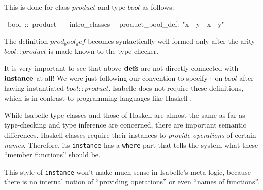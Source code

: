 \begin{isabelle}
\begin{isamarkuptext}
 This is done for class $product$ and type $bool$ as follows.%
\end{isamarkuptext}%
~bool~::~product\isanewline
~~~intro\_classes\isanewline
{}\isanewline
~~product\_bool\_def:~{"}x~{\isasymOtimes}~y~{\isasymequiv}~x~{\isasymand}~y{"}%
\begin{isamarkuptext}%
The definition $prod_bool_def$ becomes syntactically well-formed only
 after the arity $bool :: product$ is made known to the type checker.

 \medskip It is very important to see that above ${\mathord{\mathbf{defs}}}$ are not
 directly connected with ${\mathord{\mathbf{instance}}}$ at all!  We were
 just following our convention to specify $\cdot$ on $bool$ after
 having instantiated $bool :: product$.  Isabelle does not require
 these definitions, which is in contrast to programming languages like
 Haskell \cite{haskell-report}.

 \medskip While Isabelle type classes and those of Haskell are almost
 the same as far as type-checking and type inference are concerned,
 there are important semantic differences.  Haskell classes require
 their instances to \emph{provide operations} of certain \emph{names}.
 Therefore, its \texttt{instance} has a \texttt{where} part that tells
 the system what these ``member functions'' should be.

 This style of \texttt{instance} won't make much sense in Isabelle's
 meta-logic, because there is no internal notion of ``providing
 operations'' or even ``names of functions''.%
\end{isamarkuptext}%
\end{isabelle}%
